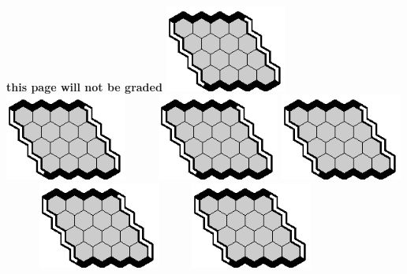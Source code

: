 \documentclass[12pt]{article}
\begin{document}
\newpage
\begin{center}
{\bf this page will not be graded}
\includegraphics[width=40mm]{fz/pix/4x4.eps}~~~~~~\includegraphics[width=40mm]{fz/pix/4x4.eps}~~~~~~\includegraphics[width=40mm]{fz/pix/4x4.eps}\vfill
\includegraphics[width=40mm]{fz/pix/4x4.eps}~~~~~~\includegraphics[width=40mm]{fz/pix/4x4.eps}~~~~~~\includegraphics[width=40mm]{fz/pix/4x4.eps}\vfill

\end{center}
\end{document}
